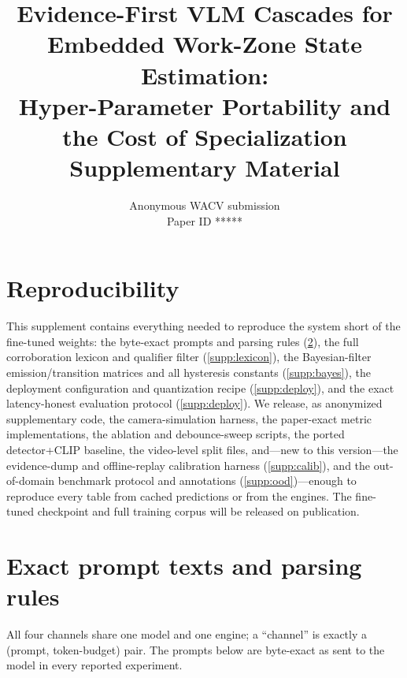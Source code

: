 \documentclass[10pt,twocolumn,letterpaper]{article}
\def\wacvPaperID{*****}
\begin{document}
\raggedbottom

\title{Evidence-First VLM Cascades for Embedded Work-Zone State Estimation:\\
Hyper-Parameter Portability and the Cost of Specialization\\
\vspace{4pt}\large Supplementary Material}

\author{Anonymous WACV submission\\
Paper ID \wacvPaperID}
\maketitle

\appendix

\section{Reproducibility}
\label{supp:repro}

This supplement contains everything needed to reproduce the system short of the fine-tuned weights: the byte-exact prompts and parsing rules (\cref{supp:prompts}), the full corroboration lexicon and qualifier filter (\cref{supp:lexicon}), the Bayesian-filter emission/transition matrices and all hysteresis constants (\cref{supp:bayes}), the deployment configuration and quantization recipe (\cref{supp:deploy}), and the exact latency-honest evaluation protocol (\cref{supp:deploy}).  We release, as anonymized supplementary code, the camera-simulation harness, the paper-exact metric implementations, the ablation and debounce-sweep scripts, the ported detector+CLIP baseline, the video-level split files, and---new to this version---the evidence-dump and offline-replay calibration harness (\cref{supp:calib}), and the out-of-domain benchmark protocol and annotations (\cref{supp:ood})---enough to reproduce every table from cached predictions or from the engines.  The fine-tuned checkpoint and full training corpus will be released on publication.

\section{Exact prompt texts and parsing rules}
\label{supp:prompts}

All four channels share one model and one engine; a ``channel'' is exactly a (prompt, token-budget) pair.  The prompts below are byte-exact as sent to the model in every reported experiment.
\end{document}
